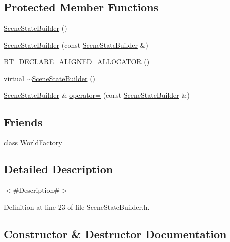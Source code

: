 \subsection*{Protected Member Functions}
\begin{DoxyCompactItemize}
\item 
\mbox{\hyperlink{classnjli_1_1_scene_state_builder_a044d81097ef875d2f0ed89ecc5041597}{Scene\+State\+Builder}} ()
\item 
\mbox{\hyperlink{classnjli_1_1_scene_state_builder_a83aa4a152e5afb7687cf1220f69fad78}{Scene\+State\+Builder}} (const \mbox{\hyperlink{classnjli_1_1_scene_state_builder}{Scene\+State\+Builder}} \&)
\item 
\mbox{\hyperlink{classnjli_1_1_scene_state_builder_a8dc264c729889a1b9d298d3723999acd}{B\+T\+\_\+\+D\+E\+C\+L\+A\+R\+E\+\_\+\+A\+L\+I\+G\+N\+E\+D\+\_\+\+A\+L\+L\+O\+C\+A\+T\+OR}} ()
\item 
virtual \mbox{\hyperlink{classnjli_1_1_scene_state_builder_a85272a153c7c378f0f11080fe06347fb}{$\sim$\+Scene\+State\+Builder}} ()
\item 
\mbox{\hyperlink{classnjli_1_1_scene_state_builder}{Scene\+State\+Builder}} \& \mbox{\hyperlink{classnjli_1_1_scene_state_builder_ae8cc4fa5a09cb1ec0973d701b6ed2ed9}{operator=}} (const \mbox{\hyperlink{classnjli_1_1_scene_state_builder}{Scene\+State\+Builder}} \&)
\end{DoxyCompactItemize}
\subsection*{Friends}
\begin{DoxyCompactItemize}
\item 
class \mbox{\hyperlink{classnjli_1_1_scene_state_builder_acb96ebb09abe8f2a37a915a842babfac}{World\+Factory}}
\end{DoxyCompactItemize}


\subsection{Detailed Description}
$<$\#\+Description\#$>$ 

Definition at line 23 of file Scene\+State\+Builder.\+h.



\subsection{Constructor \& Destructor Documentation}
\mbox{\label{classnjli_1_1_scene_state_builder_a044d81097ef875d2f0ed89ecc5041597}} 
